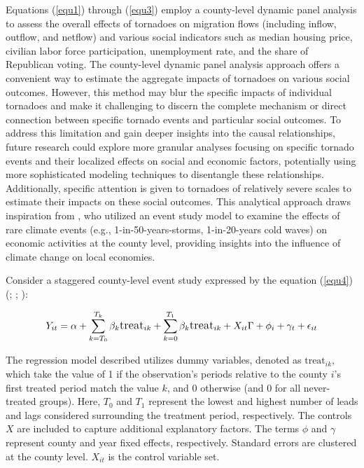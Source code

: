 \documentclass[letterpaper]{article}
\begin{document}
Equations (\ref{equ1}) through (\ref{equ3}) employ a county-level dynamic panel analysis to assess the overall effects of tornadoes on migration flows (including inflow, outflow, and netflow) and various social indicators such as median housing price, civilian labor force participation, unemployment rate, and the share of Republican voting. The county-level dynamic panel analysis approach offers a convenient way to estimate the aggregate impacts of tornadoes on various social outcomes. However, this method may blur the specific impacts of individual tornadoes and make it challenging to discern the complete mechanism or direct connection between specific tornado events and particular social outcomes. To address this limitation and gain deeper insights into the causal relationships, future research could explore more granular analyses focusing on specific tornado events and their localized effects on social and economic factors, potentially using more sophisticated modeling techniques to disentangle these relationships. Additionally, specific attention is given to tornadoes of relatively severe scales to estimate their impacts on these social outcomes. This analytical approach draws inspiration from \textcite{bilal2023anticipating}, who utilized an event study model to examine the effects of rare climate events (e.g., 1-in-50-years-storms, 1-in-20-years cold waves) on economic activities at the county level, providing insights into the influence of climate change on local economies.

Consider a staggered county-level event study expressed by the equation (\ref{equ4}) (\textcite{sun2021estimating}; \textcite{callaway2021difference}; \textcite{goodman2021difference}):

\begin{equation}
\label{equ4}
\large Y_{it} = \alpha + \sum_{k = T_0}^{T_k} \beta_k \text{treat}_{ik} + \sum_{k = 0}^{T_1} \beta_k \text{treat}_{ik} + X_{it} \Gamma + \phi_i + \gamma_t + \epsilon_{it}
\end{equation}


The regression model described utilizes dummy variables, denoted as \( \text{treat}_{ik} \), which take the value of 1 if the observation's periods relative to the county \( i \)'s first treated period match the value \( k \), and 0 otherwise (and 0 for all never-treated groups). Here, \( T_0 \) and \( T_1 \) represent the lowest and highest number of leads and lags considered surrounding the treatment period, respectively. The controls \( X \) are included to capture additional explanatory factors. The terms \( \phi \) and \( \gamma \) represent county and year fixed effects, respectively. Standard errors are clustered at the county level. $X_{it}$ is the control variable set.
\end{document}
